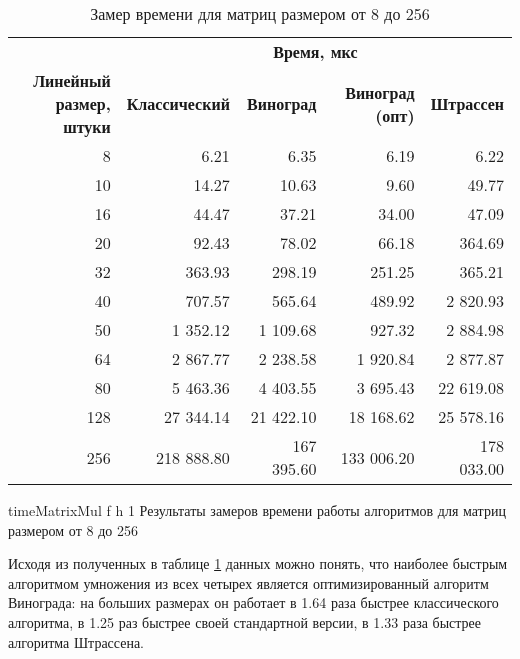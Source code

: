 \begin{table}[ht]
	\small
	\begin{center}
		\begin{threeparttable}
			\caption{Замер времени для матриц размером от 8 до 256}
			\label{tbl:time}
			\begin{tabular}{|r|r|r|r|r|}
				\hline
				& \multicolumn{4}{c|}{\bfseries Время, мкс} \\ \cline{2-5}
				\bfseries \makecell{Линейный размер, \\ штуки} & \bfseries Классический & \bfseries Виноград & \bfseries Виноград (опт) & \bfseries Штрассен  \\ \cline{2-5}
				\hline
				8 & 6.21 & 6.35 & 6.19 & 6.22 \\
				\hline
				10 & 14.27 & 10.63 & 9.60 & 49.77 \\
				\hline
				16 & 44.47 & 37.21 & 34.00 & 47.09 \\
				\hline
				20 & 92.43 & 78.02 & 66.18 & 364.69 \\
				\hline
				32 & 363.93 & 298.19 & 251.25 & 365.21 \\
				\hline
				40 &  707.57 & 565.64 & 489.92 & 2 820.93 \\
				\hline
				50 & 1 352.12 & 1 109.68 & 927.32 & 2 884.98 \\
				\hline
				64 & 2 867.77 & 2 238.58 & 1 920.84 & 2 877.87 \\
				\hline
				80 & 5 463.36 & 4 403.55 & 3 695.43 & 22 619.08 \\
				\hline
				128 & 27 344.14 & 21 422.10 & 18 168.62 & 25 578.16 \\
				\hline
				256 & 218 888.80 & 167 395.60 & 133 006.20 & 178 033.00 \\
				\hline
			\end{tabular}	
		\end{threeparttable}
	\end{center}
\end{table}

\clearpage

{timeMatrixMul} %
{f} %
{h} %
{1\textwidth} %
{Результаты замеров времени работы алгоритмов для  матриц размером от 8 до 256} %

Исходя из полученных в таблице \ref{tbl:time} данных можно понять, что наиболее быстрым алгоритмом умножения из всех четырех является оптимизированный алгоритм Винограда: на больших размерах он работает в 1.64 раза быстрее классического алгоритма, в 1.25 раз быстрее своей стандартной версии, в 1.33 раза быстрее алгоритма Штрассена.

